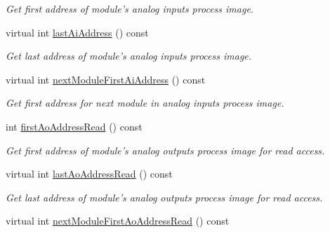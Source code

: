 \begin{DoxyCompactItemize}
\begin{DoxyCompactList}\small\item\em Get first address of module's analog inputs process image. \end{DoxyCompactList}\item 
\hypertarget{classmdt_device_modbus_wago_module_a79e994d8cbcb222eced1b70a553ca33b}{
virtual int \hyperlink{classmdt_device_modbus_wago_module_a79e994d8cbcb222eced1b70a553ca33b}{lastAiAddress} () const }
\label{classmdt_device_modbus_wago_module_a79e994d8cbcb222eced1b70a553ca33b}

\begin{DoxyCompactList}\small\item\em Get last address of module's analog inputs process image. \end{DoxyCompactList}\item 
\hypertarget{classmdt_device_modbus_wago_module_a9a76569563743da0a493766658528bb6}{
virtual int \hyperlink{classmdt_device_modbus_wago_module_a9a76569563743da0a493766658528bb6}{nextModuleFirstAiAddress} () const }
\label{classmdt_device_modbus_wago_module_a9a76569563743da0a493766658528bb6}

\begin{DoxyCompactList}\small\item\em Get first address for next module in analog inputs process image. \end{DoxyCompactList}\item 
\hypertarget{classmdt_device_modbus_wago_module_acd623a8d9956fd79c11c01879afdc73c}{
int \hyperlink{classmdt_device_modbus_wago_module_acd623a8d9956fd79c11c01879afdc73c}{firstAoAddressRead} () const }
\label{classmdt_device_modbus_wago_module_acd623a8d9956fd79c11c01879afdc73c}

\begin{DoxyCompactList}\small\item\em Get first address of module's analog outputs process image for read access. \end{DoxyCompactList}\item 
\hypertarget{classmdt_device_modbus_wago_module_a268157e43f93ae76f2950b98160a3a53}{
virtual int \hyperlink{classmdt_device_modbus_wago_module_a268157e43f93ae76f2950b98160a3a53}{lastAoAddressRead} () const }
\label{classmdt_device_modbus_wago_module_a268157e43f93ae76f2950b98160a3a53}

\begin{DoxyCompactList}\small\item\em Get last address of module's analog outputs process image for read access. \end{DoxyCompactList}\item 
\hypertarget{classmdt_device_modbus_wago_module_a76d102ba44dfc0777c8dbb5446665353}{
virtual int \hyperlink{classmdt_device_modbus_wago_module_a76d102ba44dfc0777c8dbb5446665353}{nextModuleFirstAoAddressRead} () const }
\label{classmdt_device_modbus_wago_module_a76d102ba44dfc0777c8dbb5446665353}


\end{DoxyCompactItemize}
